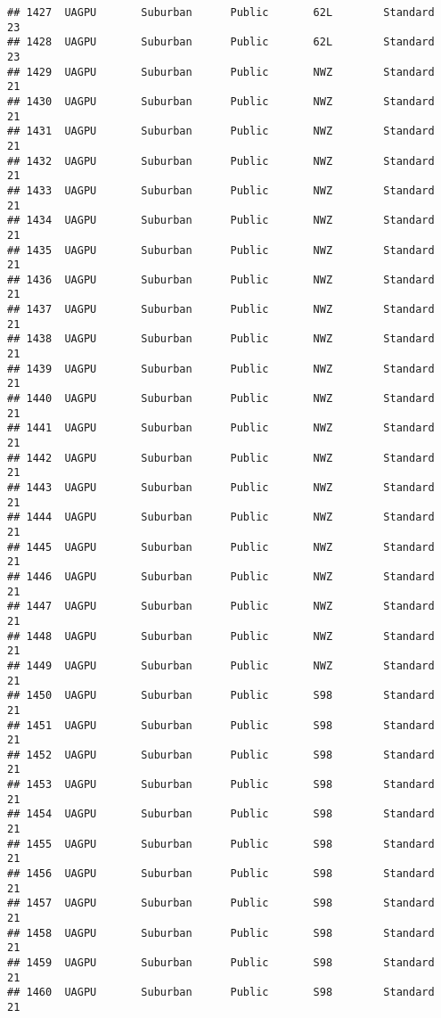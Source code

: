 \documentclass[
]{article}
\begin{document}
\begin{verbatim}
## 1427  UAGPU       Suburban      Public       62L        Standard        23
## 1428  UAGPU       Suburban      Public       62L        Standard        23
## 1429  UAGPU       Suburban      Public       NWZ        Standard        21
## 1430  UAGPU       Suburban      Public       NWZ        Standard        21
## 1431  UAGPU       Suburban      Public       NWZ        Standard        21
## 1432  UAGPU       Suburban      Public       NWZ        Standard        21
## 1433  UAGPU       Suburban      Public       NWZ        Standard        21
## 1434  UAGPU       Suburban      Public       NWZ        Standard        21
## 1435  UAGPU       Suburban      Public       NWZ        Standard        21
## 1436  UAGPU       Suburban      Public       NWZ        Standard        21
## 1437  UAGPU       Suburban      Public       NWZ        Standard        21
## 1438  UAGPU       Suburban      Public       NWZ        Standard        21
## 1439  UAGPU       Suburban      Public       NWZ        Standard        21
## 1440  UAGPU       Suburban      Public       NWZ        Standard        21
## 1441  UAGPU       Suburban      Public       NWZ        Standard        21
## 1442  UAGPU       Suburban      Public       NWZ        Standard        21
## 1443  UAGPU       Suburban      Public       NWZ        Standard        21
## 1444  UAGPU       Suburban      Public       NWZ        Standard        21
## 1445  UAGPU       Suburban      Public       NWZ        Standard        21
## 1446  UAGPU       Suburban      Public       NWZ        Standard        21
## 1447  UAGPU       Suburban      Public       NWZ        Standard        21
## 1448  UAGPU       Suburban      Public       NWZ        Standard        21
## 1449  UAGPU       Suburban      Public       NWZ        Standard        21
## 1450  UAGPU       Suburban      Public       S98        Standard        21
## 1451  UAGPU       Suburban      Public       S98        Standard        21
## 1452  UAGPU       Suburban      Public       S98        Standard        21
## 1453  UAGPU       Suburban      Public       S98        Standard        21
## 1454  UAGPU       Suburban      Public       S98        Standard        21
## 1455  UAGPU       Suburban      Public       S98        Standard        21
## 1456  UAGPU       Suburban      Public       S98        Standard        21
## 1457  UAGPU       Suburban      Public       S98        Standard        21
## 1458  UAGPU       Suburban      Public       S98        Standard        21
## 1459  UAGPU       Suburban      Public       S98        Standard        21
## 1460  UAGPU       Suburban      Public       S98        Standard        21

\end{verbatim}
\end{document}
